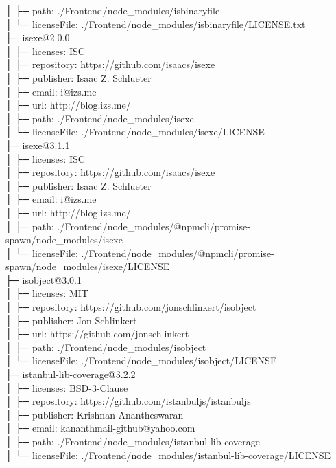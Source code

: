 │  ├─ path: ./Frontend/node\_modules/isbinaryfile\\
│  └─ licenseFile: ./Frontend/node\_modules/isbinaryfile/LICENSE.txt\\
├─ isexe@2.0.0\\
│  ├─ licenses: ISC\\
│  ├─ repository: https://github.com/isaacs/isexe\\
│  ├─ publisher: Isaac Z. Schlueter\\
│  ├─ email: i@izs.me\\
│  ├─ url: http://blog.izs.me/\\
│  ├─ path: ./Frontend/node\_modules/isexe\\
│  └─ licenseFile: ./Frontend/node\_modules/isexe/LICENSE\\
├─ isexe@3.1.1\\
│  ├─ licenses: ISC\\
│  ├─ repository: https://github.com/isaacs/isexe\\
│  ├─ publisher: Isaac Z. Schlueter\\
│  ├─ email: i@izs.me\\
│  ├─ url: http://blog.izs.me/\\
│  ├─ path: ./Frontend/node\_modules/@npmcli/promise-spawn/node\_modules/isexe\\
│  └─ licenseFile: ./Frontend/node\_modules/@npmcli/promise-spawn/node\_modules/isexe/LICENSE\\
├─ isobject@3.0.1\\
│  ├─ licenses: MIT\\
│  ├─ repository: https://github.com/jonschlinkert/isobject\\
│  ├─ publisher: Jon Schlinkert\\
│  ├─ url: https://github.com/jonschlinkert\\
│  ├─ path: ./Frontend/node\_modules/isobject\\
│  └─ licenseFile: ./Frontend/node\_modules/isobject/LICENSE\\
├─ istanbul-lib-coverage@3.2.2\\
│  ├─ licenses: BSD-3-Clause\\
│  ├─ repository: https://github.com/istanbuljs/istanbuljs\\
│  ├─ publisher: Krishnan Anantheswaran\\
│  ├─ email: kananthmail-github@yahoo.com\\
│  ├─ path: ./Frontend/node\_modules/istanbul-lib-coverage\\
│  └─ licenseFile: ./Frontend/node\_modules/istanbul-lib-coverage/LICENSE\\
